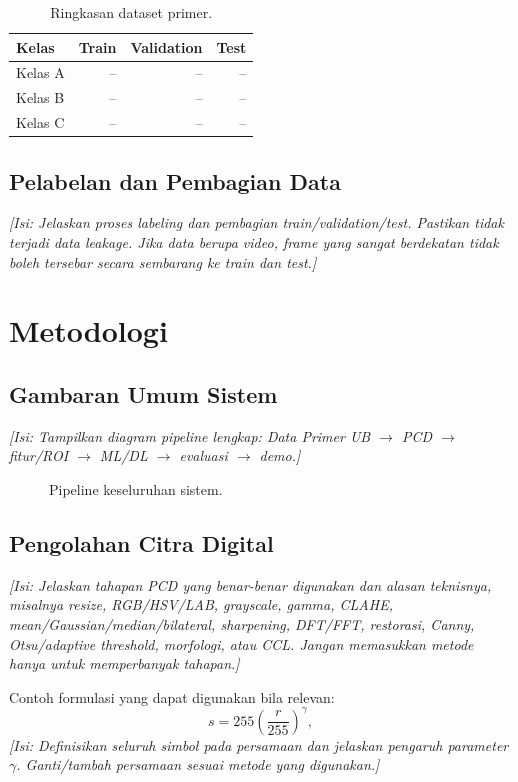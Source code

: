 \documentclass[10pt,twocolumn,a4paper]{article}
\newcommand{\isian}[1]{\textcolor{notegray}{\textit{[Isi: #1]}}}
\begin{document}
\begin{table}[H]
\centering
\caption{Ringkasan dataset primer.}
\label{tab:dataset}
\begin{tabular}{lrrr}
\toprule
Kelas & Train & Validation & Test\\
\midrule
Kelas A & -- & -- & --\\
Kelas B & -- & -- & --\\
Kelas C & -- & -- & --\\
\bottomrule
\end{tabular}
\end{table}

\subsection{Pelabelan dan Pembagian Data}
\isian{Jelaskan proses labeling dan pembagian train/validation/test. Pastikan tidak terjadi data leakage. Jika data berupa video, frame yang sangat berdekatan tidak boleh tersebar secara sembarang ke train dan test.}

\section{Metodologi}
\subsection{Gambaran Umum Sistem}
\isian{Tampilkan diagram pipeline lengkap: Data Primer UB $\rightarrow$ PCD $\rightarrow$ fitur/ROI $\rightarrow$ ML/DL $\rightarrow$ evaluasi $\rightarrow$ demo.}

\begin{figure}[H]
\centering
{}
\caption{Pipeline keseluruhan sistem.}
\label{fig:pipeline}
\end{figure}

\subsection{Pengolahan Citra Digital}
\isian{Jelaskan tahapan PCD yang benar-benar digunakan dan alasan teknisnya, misalnya resize, RGB/HSV/LAB, grayscale, gamma, CLAHE, mean/Gaussian/median/bilateral, sharpening, DFT/FFT, restorasi, Canny, Otsu/adaptive threshold, morfologi, atau CCL. Jangan memasukkan metode hanya untuk memperbanyak tahapan.}

Contoh formulasi yang dapat digunakan bila relevan:
\begin{equation}
 s = 255\left(\frac{r}{255}\right)^{\gamma},
 \label{eq:gamma}
\end{equation}
\isian{Definisikan seluruh simbol pada persamaan dan jelaskan pengaruh parameter $\gamma$. Ganti/tambah persamaan sesuai metode yang digunakan.}
\end{document}
